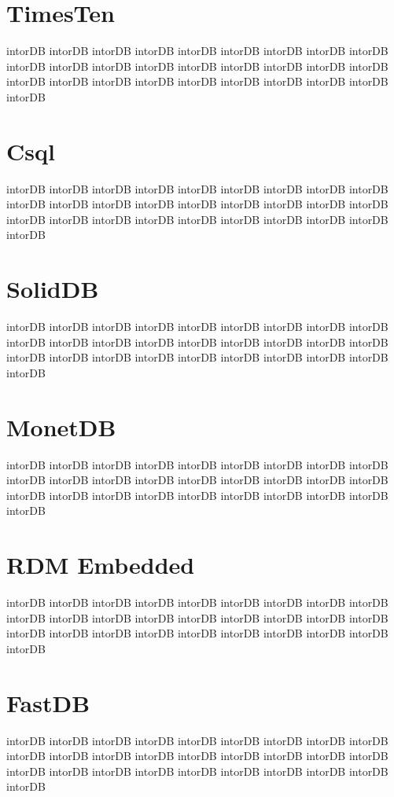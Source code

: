 		\section{TimesTen}
		intorDB intorDB intorDB intorDB intorDB intorDB intorDB 
		intorDB intorDB intorDB intorDB intorDB intorDB intorDB 
		intorDB intorDB intorDB intorDB intorDB intorDB intorDB 
		intorDB intorDB intorDB intorDB intorDB intorDB intorDB 
		
		\section{Csql}
		intorDB intorDB intorDB intorDB intorDB intorDB intorDB 
		intorDB intorDB intorDB intorDB intorDB intorDB intorDB 
		intorDB intorDB intorDB intorDB intorDB intorDB intorDB 
		intorDB intorDB intorDB intorDB intorDB intorDB intorDB 
		
		\section{SolidDB}
		intorDB intorDB intorDB intorDB intorDB intorDB intorDB 
		intorDB intorDB intorDB intorDB intorDB intorDB intorDB 
		intorDB intorDB intorDB intorDB intorDB intorDB intorDB 
		intorDB intorDB intorDB intorDB intorDB intorDB intorDB 
		
		\section{MonetDB}
		intorDB intorDB intorDB intorDB intorDB intorDB intorDB 
		intorDB intorDB intorDB intorDB intorDB intorDB intorDB 
		intorDB intorDB intorDB intorDB intorDB intorDB intorDB 
		intorDB intorDB intorDB intorDB intorDB intorDB intorDB 
		
		\section{RDM Embedded}
		intorDB intorDB intorDB intorDB intorDB intorDB intorDB 
		intorDB intorDB intorDB intorDB intorDB intorDB intorDB 
		intorDB intorDB intorDB intorDB intorDB intorDB intorDB 
		intorDB intorDB intorDB intorDB intorDB intorDB intorDB 
		
		\section{FastDB}
		intorDB intorDB intorDB intorDB intorDB intorDB intorDB 
		intorDB intorDB intorDB intorDB intorDB intorDB intorDB 
		intorDB intorDB intorDB intorDB intorDB intorDB intorDB 
		intorDB intorDB intorDB intorDB intorDB intorDB intorDB 
		
